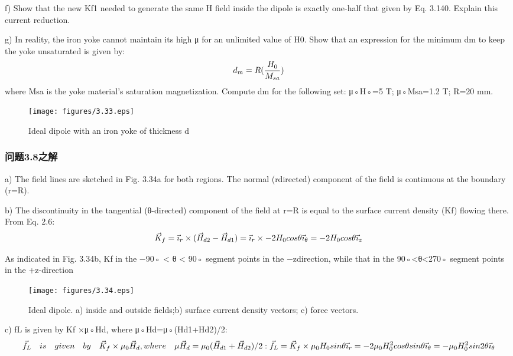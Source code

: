 f) Show that the new Kf1 needed to generate the same H field inside the dipole
is exactly one-half that given by Eq. 3.140. Explain this current reduction.

g) In reality, the iron yoke cannot maintain its high μ for an unlimited value of
H0. Show that an expression for the minimum dm to keep the yoke unsaturated is given by:
$$
d_{m}=R(\frac{H_{0}}{M_{sa}})\\%
$$
where Msa is the yoke material’s saturation magnetization. Compute dm for
the following set: μ◦H◦=5 T; μ◦Msa=1.2 T; R=20 mm.
\begin{figure}[htbp]
	\centering
	\texttt{[image: figures/3.33.eps]}
	\caption{Ideal dipole with an iron yoke of thickness d}
\end{figure}

\subsubsection{问题3.8之解}
a) The field lines are sketched in Fig. 3.34a for both regions. The normal (rdirected) component of the field is continuous at the boundary (r=R).

b) The discontinuity in the tangential (θ-directed) component of the field at
r=R is equal to the surface current density (Kf) flowing there. From Eq. 2.6:
$$
\vec{K}_{f}=\vec{\imath}_{r}\times(\vec{H}_{d2}-\vec{H}_{d1})=\vec{\imath}_{r}\times-2H_{0}cos\theta\vec{\imath}_{\theta}\\
=-2H_{0}cos\theta\vec{\imath}_{z}\\%
$$

As indicated in Fig. 3.34b, Kf in the −90◦ < θ < 90◦ segment points in the −zdirection, while that in the 90◦<θ<270◦ segment points in the +z-direction
\begin{figure}[htbp]
	\centering
	\texttt{[image: figures/3.34.eps]}
	\caption{Ideal dipole. a) inside and outside fields;b) surface current density vectors; c) force vectors.}
\end{figure}

c) fL is given by Kf ×μ◦Hd, where μ◦Hd=μ◦(Hd1+Hd2)/2:
$$
\vec{f}_{L}\quad is\quad given\quad by\quad\vec{K}_{f}\times\mu_{0}\vec{H}_{d},where\quad\mu \vec{H}_{d}=\mu_{0}(\vec{H}_{d1}+\vec{H}_{d2})/2:\\
\vec{f}_{L}=\vec{K}_{f}\times\mu_{0}H_{0}sin\theta\vec{\imath}_{r}\\%
=-2\mu_{0}H_{0}^{2}cos\theta sin\theta\vec{\imath}_{\theta}\\
=-\mu_{0}H_{0}^{2}sin2\theta\vec{\imath}_{\theta}\\%
$$

